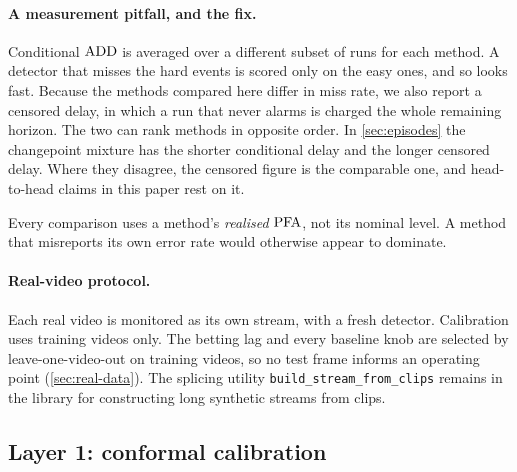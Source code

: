 \paragraph{A measurement pitfall, and the fix.}
Conditional $\mathrm{ADD}$ is averaged over a different subset of runs for each method. A detector that misses the hard events is scored only on the easy ones, and so looks fast. Because the methods compared here differ in miss rate, we also report a censored delay, in which a run that never alarms is charged the whole remaining horizon. The two can rank methods in opposite order. In \cref{sec:episodes} the changepoint mixture has the shorter conditional delay and the longer censored delay. Where they disagree, the censored figure is the comparable one, and head-to-head claims in this paper rest on it.

Every comparison uses a method's \emph{realised} $\mathrm{PFA}$, not its nominal level. A method that misreports its own error rate would otherwise appear to dominate.

\paragraph{Real-video protocol.}
Each real video is monitored as its own stream, with a fresh detector. Calibration uses training videos only. The betting lag and every baseline knob are selected by leave-one-video-out on training videos, so no test frame informs an operating point (\cref{sec:real-data}). The splicing utility \texttt{build\_stream\_from\_clips} remains in the library for constructing long synthetic streams from clips.

\subsection{Layer 1: conformal calibration}
\label{sec:layer1}

